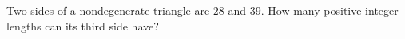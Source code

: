 Two sides of a nondegenerate triangle are $28$ and $39$. How many positive integer lengths can its third side have?
